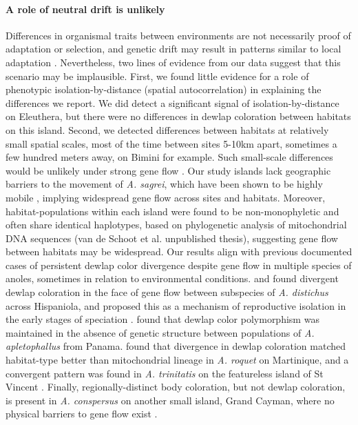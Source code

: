 \paragraph{A role of neutral drift is unlikely} Differences in organismal traits between environments are not necessarily proof of adaptation or selection, and genetic drift may result in patterns similar to local adaptation \citep{Miles2019}. Nevertheless, two lines of evidence from our data suggest that this scenario may be implausible. First, we found little evidence for a role of phenotypic isolation-by-distance (spatial autocorrelation) in explaining the differences we report. We did detect a significant signal of isolation-by-distance on Eleuthera, but there were no differences in dewlap coloration between habitats on this island. Second, we detected differences between habitats at relatively small spatial scales, most of the time between sites 5-10km apart, sometimes a few hundred meters away, on Bimini for example. Such small-scale differences would be unlikely under strong gene flow \citep{Richardson2014}. Our study islands lack geographic barriers to the movement of \textit{A. sagrei}, which have been shown to be highly mobile \citep{Kamath2018}, implying widespread gene flow across sites and habitats. Moreover, habitat-populations within each island were found to be non-monophyletic and often share identical haplotypes, based on phylogenetic analysis of mitochondrial DNA sequences (van de Schoot et al. unpublished thesis), suggesting gene flow between habitats may be widespread. Our results align with previous documented cases of persistent dewlap color divergence despite gene flow in multiple species of anoles, sometimes in relation to environmental conditions. \citet{Ng2012} and \citet{Ng2016} found divergent dewlap coloration in the face of gene flow between subspecies of \textit{A. distichus} across Hispaniola, and proposed this as a mechanism of reproductive isolation in the early stages of speciation \citep{Ng2011, Lambert2013, Ng2017}. \citet{Stapley2011} found that dewlap color polymorphism was maintained in the absence of genetic structure between populations of \textit{A. apletophallus} from Panama. \citet{Thorpe2002a} found that divergence in dewlap coloration matched habitat-type better than mitochondrial lineage in \textit{A. roquet} on Martinique, and a convergent pattern was found in \textit{A. trinitatis} on the featureless island of St Vincent \citep{Thorpe2002b}. Finally, regionally-distinct body coloration, but not dewlap coloration, is present in \textit{A. conspersus} on another small island, Grand Cayman, where no physical barriers to gene flow exist \citep{Macedonia2001}.\\

